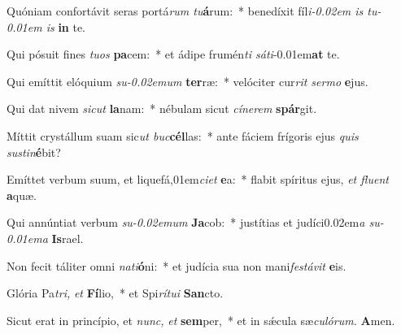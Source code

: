 \item Quóniam confortávit seras portá\textit{rum tu}\textbf{á}rum:~* benedíxit fíl\textit{i\kern -0.02em is tu\kern -0.01em is} \textbf{in} te.
\item Qui pósuit fines \textit{tuos} \textbf{pa}cem:~* et ádipe frumén\textit{ti sáti}\kern -0.01em\textbf{at} te.
\item Qui emíttit elóquium \textit{su\kern -0.02emum} \textbf{ter}ræ:~* velóciter cur\textit{rit sermo} \textbf{e}jus.
\item Qui dat nivem \textit{sicut} \textbf{la}nam:~* nébulam sicut \textit{cínerem} \textbf{spár}git.
\item Míttit crystállum suam sic\textit{ut buc}\textbf{cél}las:~* ante fáciem frígoris ejus \textit{quis sus\-tin}\textbf{é}bit?
\item Emíttet verbum suum, et liquefá,01em\textit{ciet} \textbf{e}a:~* flabit spíritus ejus, \textit{et fluent} \textbf{a}quæ.
\item Qui annúntiat verbum \textit{su\kern-0.02emum} \textbf{Ja}cob:~* justítias et judíci\kern 0.02em\textit{a su\kern -0.01ema} \textbf{Is}rael.
\item Non fecit táliter omni \textit{nati}\textbf{ó}ni:~* et judícia sua non mani\textit{festávit} \textbf{e}is.
\item Glória Pa\tinyhspace\textit{tri,} \textit{et} \textbf{Fí}lio,~* et Spi\tinyhspace\textit{rítui} \textbf{San}cto.
\item Sicut erat in princípio, et \textit{nunc,} \textit{et} \textbf{sem}per,~* et in sǽcula sæ\tinyhspace\textit{culórum.} \textbf{A}men.